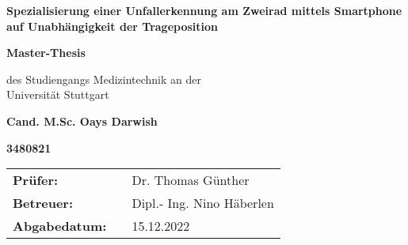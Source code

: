 \relax
\begin{center}
	\begin{center}
	\end{center}
	\vspace*{2.5cm} 
	\begin{center}
		\LARGE\textbf{Spezialisierung einer Unfallerkennung am Zweirad mittels Smartphone auf Unabhängigkeit der Trageposition}
	\end{center}
	\vspace{2.5cm}
	
	\begin{center}
		\textbf{Master-Thesis}
	\end{center}
	\vspace{1cm}
	
	\begin{center}
		des Studiengangs Medizintechnik an der\\
		Universität Stuttgart
	\end{center}
	\vspace{1.8cm}
	\begin{center}
		\textbf{Cand. M.Sc. Oays Darwish} 
	\end{center}	
	
	\begin{center}
		\textbf{3480821}
	\end{center}
	\vspace{2.5cm}
	\begin{center}
		\begin{tabular}{lll}
			\textbf{Prüfer: }&& Dr. Thomas Günther\\
			\textbf{Betreuer:}&& Dipl.- Ing. Nino Häberlen \\
			\textbf{Abgabedatum: }&& 15.12.2022\\
		\end{tabular}
	\end{center}	
	
\end{center}